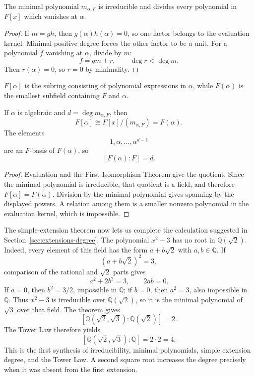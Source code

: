 \begin{proposition}\label{thm:minimal-polynomial}
The minimal polynomial \(m_{\alpha,F}\) is irreducible and divides every
polynomial in \(F[x]\) which vanishes at \(\alpha\).
\end{proposition}
\begin{proof}
If \(m=gh\), then \(g(\alpha)h(\alpha)=0\), so one factor belongs to the
evaluation kernel.  Minimal positive degree forces the other factor to be a
unit.  For a polynomial \(f\) vanishing at \(\alpha\), divide by \(m\):
\[
f=qm+r,
\qquad
\deg r<\deg m.
\]
Then \(r(\alpha)=0\), so \(r=0\) by minimality.
\end{proof}

\begin{definition}
\(F[\alpha]\) is the subring consisting of polynomial expressions in
\(\alpha\), while \(F(\alpha)\) is the smallest subfield containing \(F\)
and \(\alpha\).
\end{definition}

\begin{theorem}\label{thm:simple-algebraic}
If \(\alpha\) is algebraic and \(d=\deg m_{\alpha,F}\), then
\[
F[\alpha]\cong F[x]/(m_{\alpha,F})=F(\alpha).
\]
The elements
\[
1,\alpha,\ldots,\alpha^{d-1}
\]
are an \(F\)-basis of \(F(\alpha)\), so
\[
[F(\alpha):F]=d.
\]
\end{theorem}
\begin{proof}
Evaluation and the First Isomorphism Theorem give the quotient.  Since the
minimal polynomial is irreducible, that quotient is a field, and therefore
\(F[\alpha]=F(\alpha)\).  Division by the minimal polynomial gives spanning
by the displayed powers.  A relation among them is a smaller nonzero
polynomial in the evaluation kernel, which is impossible.
\end{proof}

\begin{example}\label{ex:two-square-roots}
The simple-extension theorem now lets us complete the calculation suggested
in Section~\ref{sec:extensions-degree}.  The polynomial \(x^2-3\) has no root in
\(\mathbb Q(\sqrt2)\).  Indeed, every element of this field has the form
\(a+b\sqrt2\) with \(a,b\in\mathbb Q\).  If
\[
(a+b\sqrt2)^2=3,
\]
comparison of the rational and \(\sqrt2\) parts gives
\[
a^2+2b^2=3,
\qquad
2ab=0.
\]
If \(a=0\), then \(b^2=3/2\), impossible in \(\mathbb Q\); if \(b=0\), then
\(a^2=3\), also impossible in \(\mathbb Q\).  Thus \(x^2-3\) is
irreducible over \(\mathbb Q(\sqrt2)\), so it is the minimal polynomial of
\(\sqrt3\) over that field.  The theorem gives
\[
[\mathbb Q(\sqrt2,\sqrt3):\mathbb Q(\sqrt2)]=2.
\]
The Tower Law therefore yields
\[
[\mathbb Q(\sqrt2,\sqrt3):\mathbb Q]
=2\cdot2=4.
\]
This is the first synthesis of irreducibility, minimal polynomials, simple
extension degree, and the Tower Law.  A second square root increases the
degree precisely when it was absent from the first extension.
\end{example}

